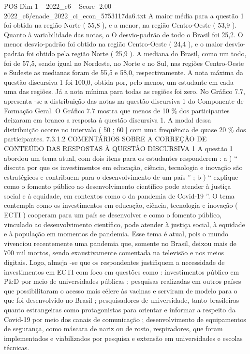 \begin{textsample}{POS Dim 1 – 2022\_c6 – Score -2.00 – 2022\_c6/enade\_2022\_ci\_econ\_5753117da6.txt}
A maior média para a questão 1 foi obtida na região Norte ( 55,8 ), e a menor, na região Centro-Oeste ( 53,9 ).
Quanto à variabilidade das notas, o O desvio-padrão de todo o Brasil foi 25,2.
O menor desvio-padrão foi obtido na região Centro-Oeste ( 24,4 ), e o maior desvio-padrão foi obtido pela região Norte ( 25,9 ).
A mediana do Brasil, como um todo, foi de 57,5, sendo igual no Nordeste, no Norte e no Sul, nas regiões Centro-Oeste e Sudeste as medianas foram de 55,5 e 58,0, respectivamente.
A nota máxima da questão discursiva 1 foi 100,0, obtida por, pelo menos, um estudante em cada uma das regiões.
Já a nota mínima para todas as regiões foi zero.
No Gráfico 7.7, apresenta -se a distribuição das notas na questão discursiva 1 do Componente de Formação Geral.
O Gráfico 7.7 mostra que menos de 10 \% dos participantes deixaram em branco a resposta à questão discursiva 1.
A modal dessa distribuição ocorre no intervalo ( 50 ; 60 ] com uma frequência de quase 20 \% dos participantes. 7.3.1.2 COMENTÁRIOS SOBRE A CORREÇÃO DE CONTEÚDO DAS RESPOSTAS À QUESTÃO DISCURSIVA 1 A questão 1 abordou um tema atual, com dois itens para os estudantes responderem : a ) “ discuta por que os investimentos em educação, ciência, tecnologia e inovação são estratégicos e contribuem para o desenvolvimento de um país ” ; b ) “ explique como o fomento público ao desenvolvimento científico pode atender à justiça social e à equidade, em contextos como o da pandemia de Covid-19 ”.
O tema contempla como os investimentos em educação, ciência, tecnologia e inovação ( ECTI ) cooperam para um país se desenvolver e como o fomento público, vinculado ao desenvolvimento científico, pode atender à justiça social, à equidade e à população em momentos de pandemia.
Esse tema é atual, pois o mundo vivenciou recentemente uma pandemia que, somente no Brasil, deixou mais de 700 mil mortos, sendo exaustivamente comentada na televisão e nos meios digitais.
Logo, almeja -se que os respondentes justifiquem a necessidade de investimentos em ECTI com foco em questões como : investimentos público em P\&D por meio de universidades públicas ; pesquisas realizadas em outros países que possibilitaram o acesso mais célere às vacinas e serviram de modelo para o que foi desenvolvido no Brasil ; pesquisadores de universidade, tanto brasileiras quanto estrangeiras como protagonistas para orientar e informar a respeito da Covid-19 por meio dos canais de comunicação ; desenvolvimento de equipamentos de segurança, como máscara de nariz ou de rosto, respiradores, que foram implementados e viabilizados por pesquisa e extensão em universidades e escolas técnicas.

\end{textsample}
